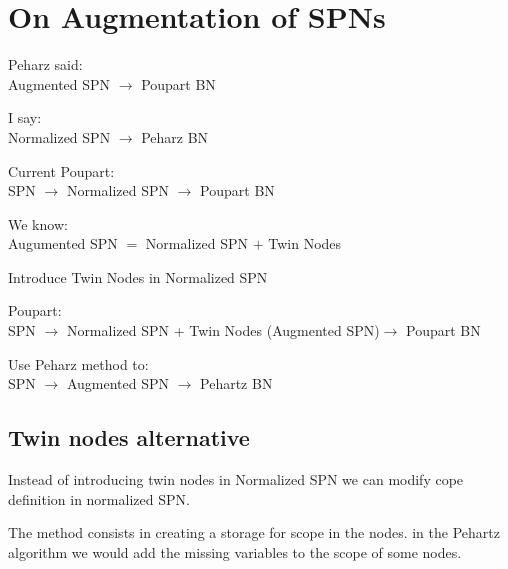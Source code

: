 \section{On Augmentation of SPNs}

Peharz said: \\
Augmented SPN $\rightarrow$ Poupart BN

I say: \\
Normalized SPN $\rightarrow$ Peharz BN

Current Poupart:\\
	SPN $\rightarrow$ Normalized SPN $\rightarrow$ Poupart BN

We know:\\
	Augumented SPN $=$ Normalized SPN $+$ Twin Nodes
	

Introduce Twin Nodes in Normalized SPN

Poupart:\\
	SPN $\rightarrow$ Normalized SPN + Twin Nodes (Augmented SPN)$\rightarrow$ Poupart BN
	
Use Peharz method to:\\
	SPN $\rightarrow$ Augmented SPN $\rightarrow$ Pehartz BN
	
\subsection{Twin nodes alternative}

Instead of introducing twin nodes in Normalized SPN we can modify cope definition in normalized SPN.

The method consists in creating a storage for scope in the nodes.
in the Pehartz algorithm we would add the missing variables to the scope of some nodes.